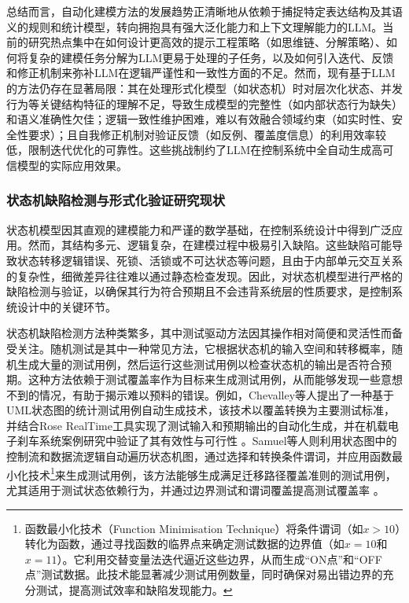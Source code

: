 总结而言，自动化建模方法的发展趋势正清晰地从依赖于捕捉特定表达结构及其语义的规则和统计模型，转向拥抱具有强大泛化能力和上下文理解能力的LLM。当前的研究热点集中在如何设计更高效的提示工程策略（如思维链、分解策略）、如何将复杂的建模任务分解为LLM更易于处理的子任务，以及如何引入迭代、反馈和修正机制来弥补LLM在逻辑严谨性和一致性方面的不足。然而，现有基于LLM的方法仍存在显著局限：其在处理形式化模型（如状态机）时对层次化状态、并发行为等关键结构特征的理解不足，导致生成模型的完整性（如内部状态行为缺失）和语义准确性欠佳；逻辑一致性维护困难，难以有效融合领域约束（如实时性、安全性要求）；且自我修正机制对验证反馈（如反例、覆盖度信息）的利用效率较低，限制迭代优化的可靠性。这些挑战制约了LLM在控制系统中全自动生成高可信模型的实际应用效果。




\subsubsection{状态机缺陷检测与形式化验证研究现状}

状态机模型因其直观的建模能力和严谨的数学基础，在控制系统设计中得到广泛应用。然而，其结构多元、逻辑复杂，在建模过程中极易引入缺陷。这些缺陷可能导致状态转移逻辑错误、死锁、活锁或不可达状态等问题，且由于内部单元交互关系的复杂性，细微差异往往难以通过静态检查发现。因此，对状态机模型进行严格的缺陷检测与验证，以确保其行为符合预期且不会违背系统层的性质要求，是控制系统设计中的关键环节。

状态机缺陷检测方法种类繁多，其中测试驱动方法因其操作相对简便和灵活性而备受关注。随机测试是其中一种常见方法，它根据状态机的输入空间和转移概率，随机生成大量的测试用例，然后运行这些测试用例以检查状态机的输出是否符合预期。这种方法依赖于测试覆盖率作为目标来生成测试用例，从而能够发现一些意想不到的情况，有助于揭示难以预料的错误。例如，Chevalley等人提出了一种基于UML状态图的统计测试用例自动生成技术，该技术以覆盖转换为主要测试标准，并结合Rose RealTime工具实现了测试输入和预期输出的自动化生成，并在机载电子刹车系统案例研究中验证了其有效性与可行性 。Samuel等人则利用状态图中的控制流和数据流逻辑自动遍历状态机图，通过选择和转换条件谓词，并应用函数最小化技术\footnote{函数最小化技术（Function Minimisation Technique）将条件谓词（如$x > 10$）转化为函数，通过寻找函数的临界点来确定测试数据的边界值（如$x=10$和$x=11$）。它利用交替变量法迭代逼近这些边界，从而生成“ON点”和“OFF点”测试数据。此技术能显著减少测试用例数量，同时确保对易出错边界的充分测试，提高测试效率和缺陷发现能力。}来生成测试用例，该方法能够生成满足迁移路径覆盖准则的测试用例，尤其适用于测试状态依赖行为，并通过边界测试和谓词覆盖提高测试覆盖率 。

